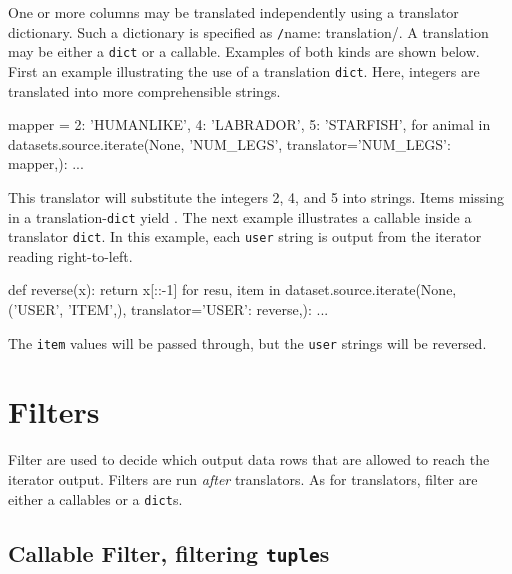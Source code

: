 One or more columns may be translated independently using a translator
dictionary.  Such a dictionary is specified
as \texttt/{name: translation}/.  A translation may be
either a \texttt{dict} or a callable.  Examples of both kinds are
shown below.  First an example illustrating the use of a
translation \texttt{dict}.  Here, integers are translated into more
comprehensible strings.
\begin{python}
mapper = {2: 'HUMANLIKE', 4: 'LABRADOR', 5: 'STARFISH',}
for animal in datasets.source.iterate(None, 'NUM_LEGS',
                                      translator={'NUM_LEGS': mapper,}):
    ...
\end{python}
This translator will substitute the integers 2, 4, and 5 into strings.
Items missing in a translation-\texttt{dict} yield \pyNone.  The next
example illustrates a callable inside a translator \texttt{dict}.  In
this example, each \texttt{user} string is output from the iterator
reading right-to-left.
\begin{python}
def reverse(x):
    return x[::-1]
for resu, item in dataset.source.iterate(None, ('USER', 'ITEM',),
                                         translator={'USER': reverse,}):
    ...
\end{python}
The \texttt{item} values will be passed through, but the \texttt{user}
strings will be reversed.



\section{Filters}
\label{sec:filters}

Filter are used to decide which output data rows that are allowed to
reach the iterator output.  Filters are run \emph{after} translators.
As for translators, filter are either a callables or a \texttt{dict}s.




\subsection*{Callable Filter, filtering \texttt{tuple}s}

